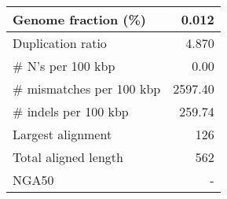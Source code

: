 \documentclass[12pt,a4paper]{article}
\begin{document}
\begin{table}[ht]
\begin{center}
\begin{tabular}{|l*{1}{|r}|}
Genome fraction (\%) & 0.012 \\ \hline
Duplication ratio & 4.870 \\ \hline
\# N's per 100 kbp & 0.00 \\ \hline
\# mismatches per 100 kbp & 2597.40 \\ \hline
\# indels per 100 kbp & 259.74 \\ \hline
Largest alignment & 126 \\ \hline
Total aligned length & 562 \\ \hline
NGA50 & - \\ \hline
\end{tabular}
\end{center}
\end{table}
\end{document}
